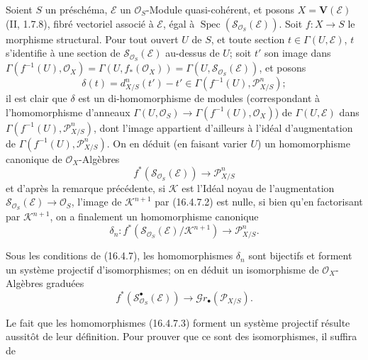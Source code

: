 \begin{env}[16.4.7]
\label{IV.16.4.7}
Soient $S$ un préschéma, $\mathscr{E}$ un $\mathcal{O}_S$-Module
quasi-cohérent, et posons $X=\mathbf{V}(\mathscr{E})$ (II, 1.7.8), fibré
vectoriel associé à $\mathscr{E}$, égal à
$\operatorname{Spec}(\mathscr{S}_{\mathcal{O}_S}(\mathscr{E}))$. Soit
$f:X\to S$ le morphisme structural. Pour tout ouvert $U$ de $S$, et toute
section $t\in\Gamma(U,\mathscr{E})$, $t$ s'identifie à une section de
$\mathscr{S}_{\mathcal{O}_S}(\mathscr{E})$ au-dessus de $U$; soit $t'$ son
image dans
$\Gamma(f^{-1}(U),\mathcal{O}_X)=\Gamma(U,f_*(\mathcal{O}_X))=
\Gamma(U,\mathscr{S}_{\mathcal{O}_S}(\mathscr{E}))$, et posons
\[
  \delta(t)=d_{X/S}^n(t')-t'\in
  \Gamma(f^{-1}(U),\mathscr{P}_{X/S}^n);
  \tag{16.4.7.1}
  \label{IV.16.4.7.1}
\]
il est clair que $\delta$ est un di-homomorphisme de modules (correspondant à
l'homomorphisme d'anneaux
$\Gamma(U,\mathcal{O}_S)\to\Gamma(f^{-1}(U),\mathcal{O}_X)$) de
$\Gamma(U,\mathscr{E})$ dans $\Gamma(f^{-1}(U),\mathscr{P}_{X/S}^n)$, dont
l'image appartient d'ailleurs à l'idéal d'augmentation de
$\Gamma(f^{-1}(U),\mathscr{P}_{X/S}^n)$. On en déduit (en faisant varier $U$)
un homomorphisme canonique de $\mathcal{O}_X$-Algèbres
\[
  f^*(\mathscr{S}_{\mathcal{O}_S}(\mathscr{E}))
  \longrightarrow\mathscr{P}_{X/S}^n
  \tag{16.4.7.2}
  \label{IV.16.4.7.2}
\]
et d'après la remarque précédente, si $\mathscr{K}$ est l'Idéal noyau de
l'augmentation $\mathscr{S}_{\mathcal{O}_S}(\mathscr{E})\to\mathcal{O}_S$,
l'image de $\mathscr{K}^{n+1}$ par (16.4.7.2) est nulle, si bien qu'en
factorisant par $\mathscr{K}^{n+1}$, on a finalement un homomorphisme canonique
\[
  \delta_n:f^*(\mathscr{S}_{\mathcal{O}_S}(\mathscr{E})/
  \mathscr{K}^{n+1})\longrightarrow\mathscr{P}_{X/S}^n.
  \tag{16.4.7.3}
  \label{IV.16.4.7.3}
\]
\end{env}

\begin{proposition}[16.4.8]
\label{IV.16.4.8}
Sous les conditions de (16.4.7), les homomorphismes $\delta_n$ sont bijectifs et
forment un système projectif d'isomorphismes; on en déduit un isomorphisme de
$\mathcal{O}_X$-Algèbres graduées
\[
  f^*(\mathscr{S}_{\mathcal{O}_S}^{\bullet}(\mathscr{E}))
  \longrightarrow\mathscr{G}r_\bullet(\mathscr{P}_{X/S}).
  \tag{16.4.8.1}
  \label{IV.16.4.8.1}
\]
\end{proposition}

Le fait que les homomorphismes (16.4.7.3) forment un système projectif résulte
aussitôt de leur définition. Pour prouver que ce sont des isomorphismes, il
suffira de
